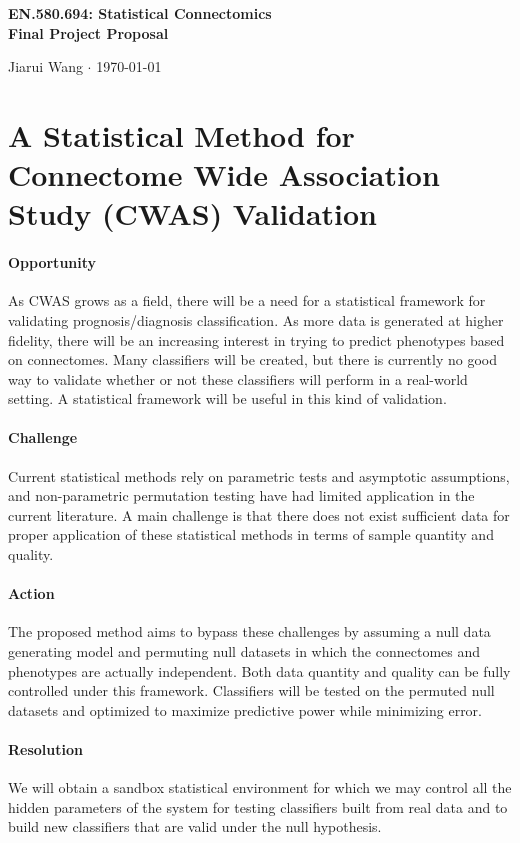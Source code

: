 \documentclass[12pt]{article}
\begin{document}
\begin{center}\Large \bf EN.580.694: Statistical Connectomics \\ Final Project Proposal \end{center}
\begin{center} Jiarui Wang $\cdot$  \today \end{center}
\bigskip

\section*{A Statistical Method for Connectome Wide Association Study (CWAS) Validation}

\paragraph{Opportunity}
As CWAS grows as a field, there will be a need for a statistical framework for validating prognosis/diagnosis classification. As more data is generated at higher fidelity, there will be an increasing interest in trying to predict phenotypes based on connectomes. Many classifiers will be created, but there is currently no good way to validate whether or not these classifiers will perform in a real-world setting. A statistical framework will be useful in this kind of validation.
\paragraph{Challenge}
Current statistical methods rely on parametric tests and asymptotic assumptions, and non-parametric permutation testing have had limited application in the current literature. A main challenge is that there does not exist sufficient data for proper application of these statistical methods in terms of sample quantity and quality. 
\paragraph{Action}
The proposed method aims to bypass these challenges by assuming a null data generating model and permuting null datasets in which the connectomes and phenotypes are actually independent. Both data quantity and quality can be fully controlled under this framework. Classifiers will be tested on the permuted null datasets and optimized to maximize predictive power while minimizing error. 
\paragraph{Resolution}
We will obtain a sandbox statistical environment for which we may control all the hidden parameters of the system for testing classifiers built from real data and to build new classifiers that are valid under the null hypothesis. 
\end{document}
